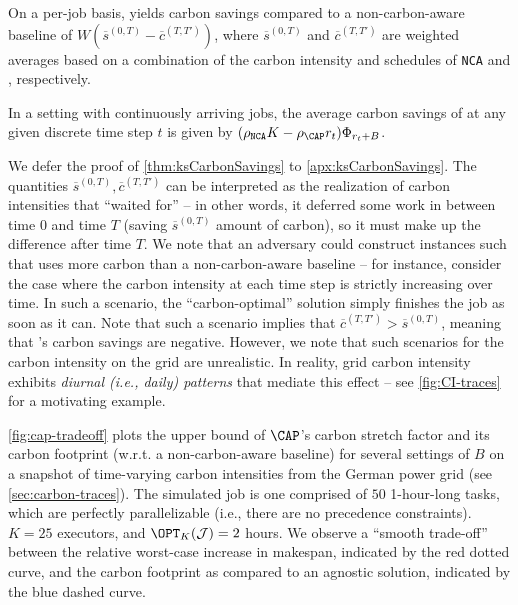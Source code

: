 \begin{thm}\label{thm:ksCarbonSavings}
   On a per-job basis, \CAP yields carbon savings compared to a non-carbon-aware baseline of $W \left( \overline{s}^{(0,T)} - \overline{c}^{(T, T')} \right)$, where $\overline{s}^{(0,T)}$ and $\overline{c}^{(T, T')}$ are weighted averages based on a combination of the carbon intensity and schedules of \texttt{NCA} and \CAP, respectively. %

   In a setting with continuously arriving jobs, the average carbon savings of \CAP at any given discrete time step $t$ is given by $(\rho_{\texttt{NCA}} K - \rho_{\CAP} r_t ) \Phi_{r_t + B}$. %
\end{thm}

We defer the proof of \autoref{thm:ksCarbonSavings} to \autoref{apx:ksCarbonSavings}. 
The quantities $\overline{s}^{(0,T)}, \overline{c}^{(T,T')}$ can be interpreted as the realization of carbon intensities that \CAP ``waited for'' -- in other words, it deferred some work in between time $0$ and time $T$ (saving $\overline{s}^{(0,T)} $ amount of carbon), so it must make up the difference after time $T$.  
We note that an adversary could construct instances such that \CAP  uses more carbon than a non-carbon-aware baseline -- for instance, consider the case where the carbon intensity at each time step is strictly increasing over time.  In such a scenario, the ``carbon-optimal'' solution simply finishes the job as soon as it can.  Note that such a scenario implies that $\overline{c}^{(T,T')} > \overline{s}^{(0,T)}$, meaning that \CAP's carbon savings are negative.  However, we note that such scenarios for the carbon intensity on the grid are unrealistic.  In reality, grid carbon intensity exhibits \textit{diurnal (i.e., daily) patterns} that mediate this effect -- see \autoref{fig:CI-traces} for a motivating example. 

\autoref{fig:cap-tradeoff} plots the upper bound of $\CAP$'s carbon stretch factor and its carbon footprint (w.r.t. a non-carbon-aware baseline) for several settings of $B$ on a snapshot of time-varying carbon intensities from the German power grid (see \autoref{sec:carbon-traces}).  The simulated job is one comprised of $50$ 1-hour-long tasks, which are perfectly parallelizable (i.e., there are no precedence constraints).  $K = 25$ executors, and $\OPT_K(\mathcal{J}) = 2$ hours.  We observe a ``smooth trade-off'' between the relative worst-case increase in makespan, indicated by the red dotted curve, and the carbon footprint as compared to an agnostic solution, indicated by the blue dashed curve.


